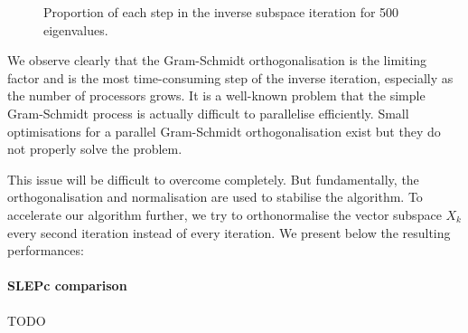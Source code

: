 \begin{figure}[H]
  \centering
  
  \caption{Proportion of each step in the inverse subspace iteration for 500 eigenvalues.}
\end{figure}

We observe clearly that the Gram-Schmidt orthogonalisation is the limiting factor and is the most time-consuming step of the inverse iteration, especially as the number of processors grows.
It is a well-known problem that the simple Gram-Schmidt process is actually difficult to parallelise efficiently.
Small optimisations for a parallel Gram-Schmidt orthogonalisation exist \cite{katagiri_parallel_gram_schmidt_2003} but they do not properly solve the problem.

This issue will be difficult to overcome completely.
But fundamentally, the orthogonalisation and normalisation are used to stabilise the algorithm.
To accelerate our algorithm further, we try to orthonormalise the vector subspace \(X_k\) every second iteration instead of every iteration.
We present below the resulting performances:

\paragraph{SLEPc comparison}
TODO
